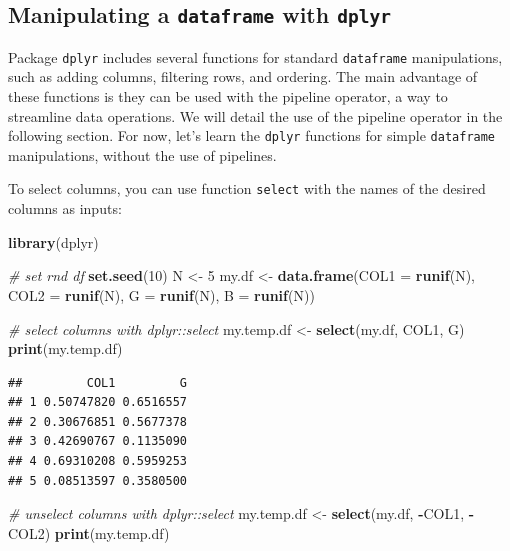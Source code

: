 \documentclass[11pt,]{book}
\newenvironment{Shaded}{\begin{snugshade}}{\end{snugshade}}
\newcommand{\KeywordTok}[1]{\textcolor[rgb]{0.27,0.27,0.27}{\textbf{#1}}}
\newcommand{\DataTypeTok}[1]{\textcolor[rgb]{0.27,0.27,0.27}{#1}}
\newcommand{\DecValTok}[1]{\textcolor[rgb]{0.06,0.06,0.06}{#1}}
\newcommand{\StringTok}[1]{\textcolor[rgb]{0.5,0.5,0.5}{#1}}
\newcommand{\CommentTok}[1]{\textcolor[rgb]{0.56,0.35,0.01}{\textit{#1}}}
\newcommand{\OperatorTok}[1]{\textcolor[rgb]{0.81,0.36,0.00}{\textbf{#1}}}
\newcommand{\NormalTok}[1]{#1}
\begin{document}
\subsection{\texorpdfstring{Manipulating a \texttt{dataframe} with
\texttt{dplyr}}{Manipulating a dataframe with dplyr}}\label{manipulating-a-dataframe-with-dplyr}

Package \texttt{dplyr} includes several functions for standard
\texttt{dataframe} manipulations, such as adding columns, filtering
rows, and ordering. The main advantage of these functions is they can be
used with the pipeline operator, a way to streamline data operations. We
will detail the use of the pipeline operator in the following section.
For now, let's learn the \texttt{dplyr} functions for simple
\texttt{dataframe} manipulations, without the use of pipelines.

To select columns, you can use function \texttt{select} with the names
of the desired columns as inputs: 

\begin{Shaded}
\begin{Highlighting}[]
\KeywordTok{library}\NormalTok{(dplyr)}

\CommentTok{# set rnd df}
\KeywordTok{set.seed}\NormalTok{(}\DecValTok{10}\NormalTok{)}
\NormalTok{N <-}\StringTok{ }\DecValTok{5}
\NormalTok{my.df <-}\StringTok{ }\KeywordTok{data.frame}\NormalTok{(}\DataTypeTok{COL1 =} \KeywordTok{runif}\NormalTok{(N), }
                    \DataTypeTok{COL2 =} \KeywordTok{runif}\NormalTok{(N), }
                    \DataTypeTok{G =} \KeywordTok{runif}\NormalTok{(N),}
                    \DataTypeTok{B =} \KeywordTok{runif}\NormalTok{(N))}

\CommentTok{# select columns with dplyr::select}
\NormalTok{my.temp.df <-}\StringTok{ }\KeywordTok{select}\NormalTok{(my.df, COL1, G)}
\KeywordTok{print}\NormalTok{(my.temp.df)}
\end{Highlighting}
\end{Shaded}

\begin{verbatim}
##         COL1         G
## 1 0.50747820 0.6516557
## 2 0.30676851 0.5677378
## 3 0.42690767 0.1135090
## 4 0.69310208 0.5959253
## 5 0.08513597 0.3580500
\end{verbatim}

\begin{Shaded}
\begin{Highlighting}[]
\CommentTok{# unselect columns with dplyr::select}
\NormalTok{my.temp.df <-}\StringTok{ }\KeywordTok{select}\NormalTok{(my.df, }\OperatorTok{-}\NormalTok{COL1, }\OperatorTok{-}\NormalTok{COL2)}
\KeywordTok{print}\NormalTok{(my.temp.df)}
\end{Highlighting}
\end{Shaded}
\end{document}
